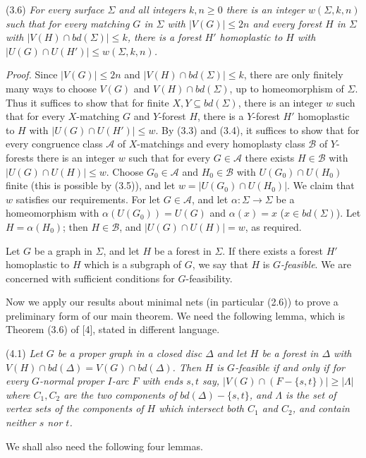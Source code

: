 \stmt
(3.6) \textit{For every surface $\Sigma$ and all integers $k, n \ge 0$ there is an integer $w(\Sigma, k, n)$ such that for every matching $G$ in $\Sigma$ with $|V(G)| \le 2n$ and every forest $H$ in $\Sigma$ with $|V(H) \cap bd(\Sigma)| \le k$, there is a forest $H'$ homoplastic to $H$ with $|U(G) \cap U(H')| \le w(\Sigma, k, n)$.}

\textit{Proof.} Since $|V(G)| \le 2n$ and $|V(H) \cap bd(\Sigma)| \le k$, there are only finitely many ways to choose $V(G)$ and $V(H) \cap bd(\Sigma)$, up to homeomorphism of $\Sigma$. Thus it suffices to show that for finite $X, Y \subseteq bd(\Sigma)$, there is an integer $w$ such that for every $X$-matching $G$ and $Y$-forest $H$, there is a $Y$-forest $H'$ homoplastic to $H$ with $|U(G) \cap U(H')| \le w$. By (3.3) and (3.4), it suffices to show that for every congruence class $\mathscr{A}$ of $X$-matchings and every homoplasty class $\mathscr{B}$ of $Y$-forests there is an integer $w$ such that for every $G \in \mathscr{A}$ there exists $H \in \mathscr{B}$ with $|U(G) \cap U(H)| \le w$. Choose $G_0 \in \mathscr{A}$ and $H_0 \in \mathscr{B}$ with $U(G_0) \cap U(H_0)$ finite (this is possible by (3.5)), and let $w = |U(G_0) \cap U(H_0)|$. We claim that $w$ satisfies our requirements. For let $G \in \mathscr{A}$, and let $\alpha \colon \Sigma \to \Sigma$ be a homeomorphism with $\alpha(U(G_0)) = U(G)$ and $\alpha(x) = x$ ($x \in bd(\Sigma)$). Let $H = \alpha(H_0)$; then $H \in \mathscr{B}$, and $|U(G) \cap U(H)| = w$, as required.


Let $G$ be a graph in $\Sigma$, and let $H$ be a forest in $\Sigma$. If there exists a forest $H'$ homoplastic to $H$ which is a subgraph of $G$, we say that $H$ is \textit{$G$-feasible}. We are concerned with sufficient conditions for $G$-feasibility.

Now we apply our results about minimal nets (in particular (2.6)) to prove a preliminary form of our main theorem. We need the following lemma, which is Theorem (3.6) of [4], stated in different language.

\stmt
(4.1) \textit{Let $G$ be a proper graph in a closed disc $\Delta$ and let $H$ be a forest in $\Delta$ with $V(H) \cap bd(\Delta) = V(G) \cap bd(\Delta)$. Then $H$ is $G$-feasible if and only if for every $G$-normal proper $I$-arc $F$ with ends $s, t$ say, $|V(G) \cap (F - \{s, t\})| \ge |\Lambda|$ where $C_1, C_2$ are the two components of $bd(\Delta) - \{s, t\}$, and $\Lambda$ is the set of vertex sets of the components of $H$ which intersect both $C_1$ and $C_2$, and contain neither $s$ nor $t$.}

We shall also need the following four lemmas.
